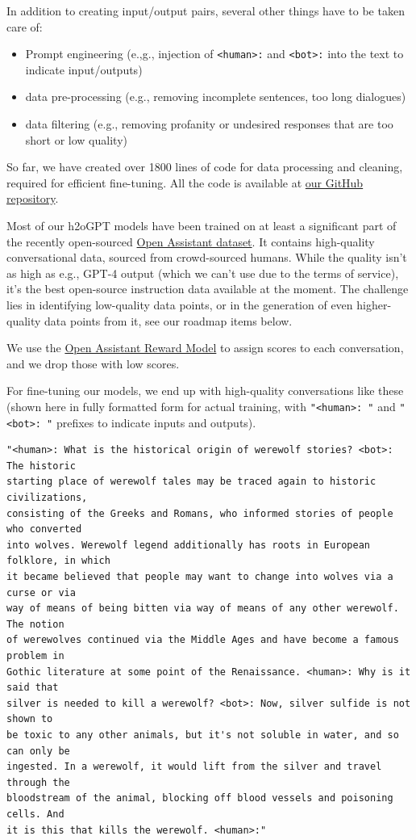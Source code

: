 \documentclass{article}
\begin{document}
In addition to creating input/output pairs, several other things have to be taken care of:
\begin{itemize}
\item Prompt engineering (e.,g., injection of \texttt{<human>:} and \texttt{<bot>:} into the text to indicate input/outputs)
\item data pre-processing (e.g., removing incomplete sentences, too long dialogues)
\item data filtering (e.g., removing profanity or undesired responses that are too short or low quality)
\end{itemize}
So far, we have created over 1800 lines of code for data processing and cleaning, required for efficient fine-tuning.
All the code is available at \href{https://github.com/h2oai/h2ogpt/blob/main/create_data.py}{our GitHub repository}.

Most of our h2oGPT models have been trained on at least a significant part of the recently open-sourced \href{https://huggingface.co/datasets/OpenAssistant/oasst1}{Open Assistant dataset}. It contains high-quality conversational data, sourced from crowd-sourced humans. While the quality isn't as high as e.g., GPT-4 output (which we can't use due to the terms of service), it's the best open-source instruction data available at the moment. The challenge lies in identifying low-quality data points, or in the generation of even higher-quality data points from it, see our roadmap items below.

We use the \href{https://huggingface.co/OpenAssistant/reward-model-deberta-v3-large-v2}{Open Assistant Reward Model} to assign scores to each conversation, and we drop those with low scores.

For fine-tuning our models, we end up with high-quality conversations like these (shown here in fully formatted form for actual training, with \texttt{"<human>: "} and \texttt{"<bot>: "} prefixes to indicate inputs and outputs).

\begin{verbatim}
"<human>: What is the historical origin of werewolf stories? <bot>: The historic 
starting place of werewolf tales may be traced again to historic civilizations, 
consisting of the Greeks and Romans, who informed stories of people who converted 
into wolves. Werewolf legend additionally has roots in European folklore, in which 
it became believed that people may want to change into wolves via a curse or via 
way of means of being bitten via way of means of any other werewolf. The notion 
of werewolves continued via the Middle Ages and have become a famous problem in 
Gothic literature at some point of the Renaissance. <human>: Why is it said that 
silver is needed to kill a werewolf? <bot>: Now, silver sulfide is not shown to 
be toxic to any other animals, but it's not soluble in water, and so can only be
ingested. In a werewolf, it would lift from the silver and travel through the 
bloodstream of the animal, blocking off blood vessels and poisoning cells. And
it is this that kills the werewolf. <human>:"	
\end{verbatim}
\end{document}

